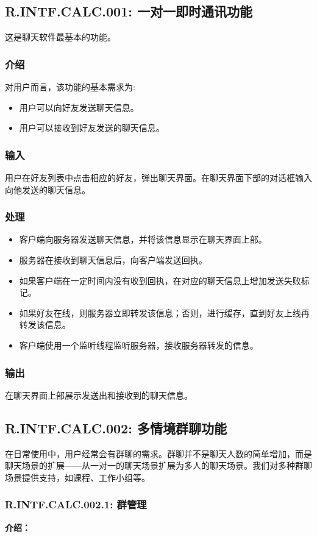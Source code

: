 \subsection{R.INTF.CALC.001: 一对一即时通讯功能}
这是聊天软件最基本的功能。
\subsubsection{介绍}
对用户而言，该功能的基本需求为:
\begin{itemize}
  \item 用户可以向好友发送聊天信息。
  \item 用户可以接收到好友发送的聊天信息。
\end{itemize}
\subsubsection{输入}
用户在好友列表中点击相应的好友，弹出聊天界面。在聊天界面下部的对话框输入向他发送的聊天信息。
\subsubsection{处理}
\begin{itemize}
  \item 客户端向服务器发送聊天信息，并将该信息显示在聊天界面上部。
  \item 服务器在接收到聊天信息后，向客户端发送回执。
  \item 如果客户端在一定时间内没有收到回执，在对应的聊天信息上增加发送失败标记。
  \item 如果好友在线，则服务器立即转发该信息；否则，进行缓存，直到好友上线再转发该信息。
  \item 客户端使用一个监听线程监听服务器，接收服务器转发的信息。
\end{itemize}
\subsubsection{输出}
在聊天界面上部展示发送出和接收到的聊天信息。


\subsection{R.INTF.CALC.002: 多情境群聊功能}
在日常使用中，用户经常会有群聊的需求。群聊并不是聊天人数的简单增加，而是聊天场景的扩展——从一对一的聊天场景扩展为多人的聊天场景。我们对多种群聊场景提供支持，如课程、工作小组等。

\subsubsection{R.INTF.CALC.002.1: 群管理}
\textbf{介绍：}

